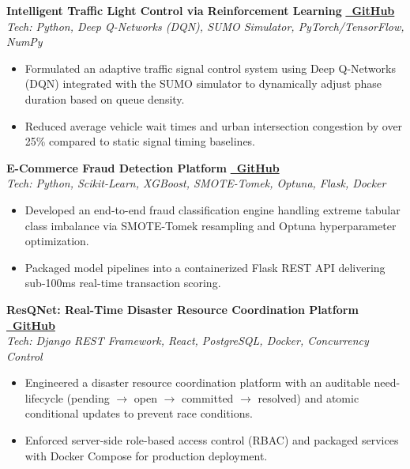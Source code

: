 \documentclass[a4paper,10pt]{article}
\newcommand{\projectEntry}[4]{
  \vspace{3pt}
  \noindent\textbf{\color{primary}#1} \hfill \href{#3}{\color{primary}\textbf{\faGithub~GitHub}} \\
  \noindent\textit{\footnotesize #2}
  \begin{itemize}[leftmargin=12pt, topsep=1pt, itemsep=1.5pt]
    #4
  \end{itemize}
}
\begin{document}
\projectEntry
  {Intelligent Traffic Light Control via Reinforcement Learning}
  {Tech: Python, Deep Q-Networks (DQN), SUMO Simulator, PyTorch/TensorFlow, NumPy}
  {https://github.com/ashraf1600/Traffic_Light_Control_using_Reinforcement_Learning}
  {
    \item Formulated an adaptive traffic signal control system using Deep Q-Networks (DQN) integrated with the SUMO simulator to dynamically adjust phase duration based on queue density.
    \item Reduced average vehicle wait times and urban intersection congestion by over 25\% compared to static signal timing baselines.
  }

\projectEntry
  {E-Commerce Fraud Detection Platform}
  {Tech: Python, Scikit-Learn, XGBoost, SMOTE-Tomek, Optuna, Flask, Docker}
  {https://github.com/ashraf1600/Fraud-Detection-ML}
  {
    \item Developed an end-to-end fraud classification engine handling extreme tabular class imbalance via SMOTE-Tomek resampling and Optuna hyperparameter optimization.
    \item Packaged model pipelines into a containerized Flask REST API delivering sub-100ms real-time transaction scoring.
  }

\projectEntry
  {ResQNet: Real-Time Disaster Resource Coordination Platform}
  {Tech: Django REST Framework, React, PostgreSQL, Docker, Concurrency Control}
  {https://github.com/Towhid454/Resqnet/tree/backend}
  {
    \item Engineered a disaster resource coordination platform with an auditable need-lifecycle (pending $\rightarrow$ open $\rightarrow$ committed $\rightarrow$ resolved) and atomic conditional updates to prevent race conditions.
    \item Enforced server-side role-based access control (RBAC) and packaged services with Docker Compose for production deployment.
  }

\end{document}
